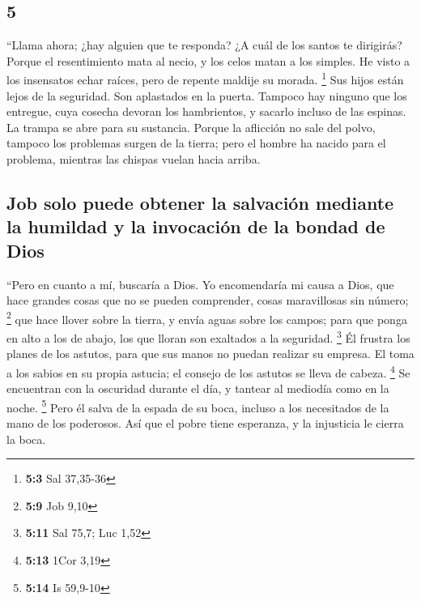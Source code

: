 \begin{paracol}{2}
\hypertarget{section-8}{%
\section{5}\label{section-8}}

 ``Llama ahora; ¿hay alguien que te responda? ¿A cuál de
los santos te dirigirás?  Porque el resentimiento mata al
necio, y los celos matan a los simples.  He visto a los
insensatos echar raíces, pero de repente maldije su morada. \footnote{\textbf{5:3}
  Sal 37,35-36}  Sus hijos están lejos de la seguridad.
Son aplastados en la puerta. Tampoco hay ninguno que los entregue,
 cuya cosecha devoran los hambrientos, y sacarlo incluso
de las espinas. La trampa se abre para su sustancia. 
Porque la aflicción no sale del polvo, tampoco los problemas surgen de
la tierra;  pero el hombre ha nacido para el problema,
mientras las chispas vuelan hacia arriba.

\hypertarget{job-solo-puede-obtener-la-salvaciuxf3n-mediante-la-humildad-y-la-invocaciuxf3n-de-la-bondad-de-dios}{%
\subsection{Job solo puede obtener la salvación mediante la humildad y
la invocación de la bondad de
Dios}\label{job-solo-puede-obtener-la-salvaciuxf3n-mediante-la-humildad-y-la-invocaciuxf3n-de-la-bondad-de-dios}}

 ``Pero en cuanto a mí, buscaría a Dios. Yo encomendaría
mi causa a Dios,  que hace grandes cosas que no se pueden
comprender, cosas maravillosas sin número; \footnote{\textbf{5:9} Job
  9,10}  que hace llover sobre la tierra, y envía aguas
sobre los campos;  para que ponga en alto a los de abajo,
los que lloran son exaltados a la seguridad. \footnote{\textbf{5:11} Sal
  75,7; Luc 1,52}  Él frustra los planes de los astutos,
para que sus manos no puedan realizar su empresa.  El
toma a los sabios en su propia astucia; el consejo de los astutos se
lleva de cabeza. \footnote{\textbf{5:13} 1Cor 3,19}  Se
encuentran con la oscuridad durante el día, y tantear al mediodía como
en la noche. \footnote{\textbf{5:14} Is 59,9-10}  Pero él
salva de la espada de su boca, incluso a los necesitados de la mano de
los poderosos.  Así que el pobre tiene esperanza, y la
injusticia le cierra la boca.


\end{paracol}
